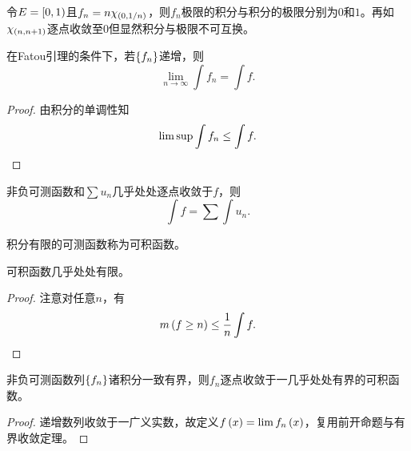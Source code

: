 \documentclass{ctexrep}
\begin{document}
  \begin{ex}
    令$E=\left[0,1\right)$且$f_n=n\chi_{\left(0,1/n\right)}$，则$f_n$极限的积分与积分的极限分别为$0$和$1$。再如$\chi_{\left(n,n+1\right)}$逐点收敛至$0$但显然积分与极限不可互换。
  \end{ex}
  \begin{theorem}[单调收敛定理]
    在Fatou引理的条件下，若$\left\{f_n\right\}$递增，则
    \[ \lim_{n\to\infty}\int f_n = \int f. \]
  \end{theorem}
  \begin{proof}
    由积分的单调性知
    \[ \lim\sup\int f_n \le \int f. \qedhere \]
  \end{proof}
  \begin{collary}
    非负可测函数和$\sum u_n$几乎处处逐点收敛于$f$，则
    \[ \int f = \sum \int u_n. \]
  \end{collary}
  \begin{definition}
    积分有限的可测函数称为可积函数。
  \end{definition}
  \begin{proposition}
    可积函数几乎处处有限。
  \end{proposition}
  \begin{proof}
    注意对任意$n$，有
    \[ m\left(f \ge n\right) \le \frac{1}{n}\int f. \]
  \end{proof}
  \begin{lemma}
    非负可测函数列$\left\{f_n\right\}$诸积分一致有界，则$f_n$逐点收敛于一几乎处处有界的可积函数。
  \end{lemma}
  \begin{proof}
    递增数列收敛于一广义实数，故定义$f\left(x\right)=\lim f_n\left(x\right)$，复用前开命题与有界收敛定理。
  \end{proof}
\end{document}
